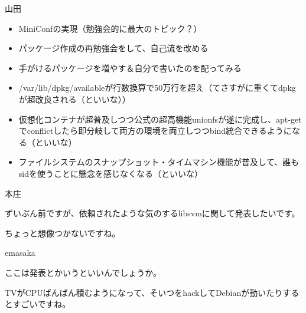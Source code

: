 \begin{prework}{ 山田 }


\begin{itemize}
 \item MiniConfの実現（勉強会的に最大のトピック？）
 \item パッケージ作成の再勉強会をして、自己流を改める
 \item 手がけるパッケージを増やす＆自分で書いたのを配ってみる
\end{itemize}


\begin{itemize}
 \item /var/lib/dpkg/availableが行数換算で50万行を超え（てさすがに重くてdpkgが超改良される（といいな））
 \item 仮想化コンテナが超普及しつつ公式の超高機能unionfsが遂に完成し、apt-getでconflictしたら即分岐して両方の環境を両立しつつbind統合できるようになる（といいな）
 \item ファイルシステムのスナップショット・タイムマシン機能が普及して、誰もsidを使うことに懸念を感じなくなる（といいな）
\end{itemize}


\end{prework}



\begin{prework}{ 本庄 }


ずいぶん前ですが、依頼されたような気のするlibsvmに関して発表したいです。


ちょっと想像つかないですね。


\end{prework}



\begin{prework}{ emasaka }


ここは発表とかいうといいんでしょうか。


TVがCPUばんばん積むようになって、そいつをhackしてDebianが動いたりするとすごいですね。

\end{prework}




